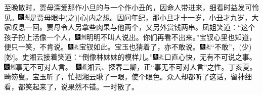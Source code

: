 至晚散时，贾母深爱那作小旦的与一个作小丑的，因命人带进来，细看时益发可怜见。{\includegraphics[width=3mm]{../Images/00004}\includegraphics[width=3mm]{../Images/00012}\footnotesize \kaishu 是贾母眼中{(之)}{[}心{]}内之想。}因问年纪，那小旦才十一岁，小丑才九岁，大家叹息一回。贾母令人另拿些肉果与他两个，又另外赏钱两串。凤姐笑道：``这个孩子扮上活像一个人，{\includegraphics[width=3mm]{../Images/00004}\includegraphics[width=3mm]{../Images/00011}\footnotesize \kaishu 明明不叫人说出。}你们再看不出来。''宝钗心里也知道，便只一笑，不肯说。{\includegraphics[width=3mm]{../Images/00004}\includegraphics[width=3mm]{../Images/00012}\footnotesize \kaishu 宝钗如此。}宝玉也猜着了，亦不敢说。{\includegraphics[width=3mm]{../Images/00004}\includegraphics[width=3mm]{../Images/00012}\footnotesize \kaishu ``不敢''，{(少)}{[}妙{]}。}史湘云接着笑道：``倒像林妹妹的模样儿。''{\includegraphics[width=3mm]{../Images/00004}\includegraphics[width=3mm]{../Images/00012}\footnotesize \kaishu 口直心快，无有不可说之事。　{\includegraphics[width=3mm]{../Images/00004}\includegraphics[width=3mm]{../Images/00011}\footnotesize \kaishu 事无不可对人言。　\includegraphics[width=3mm]{../Images/00004}\includegraphics[width=3mm]{../Images/00010}\footnotesize \kaishu 湘云、探春二卿，正``事无不可对人言''之性。丁亥夏。畸笏叟。}}宝玉听了，忙把湘云瞅了一眼，使个眼色。众人却都听了这话，留神细看，都笑起来了，说果然不错。一时散了。

